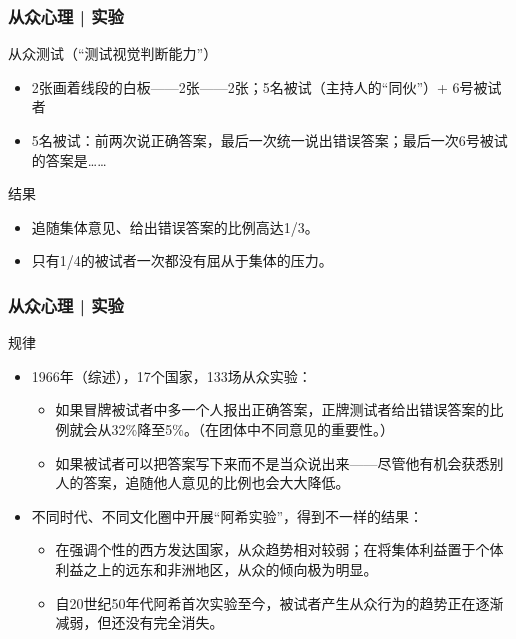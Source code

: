 \begin{frame}
  \frametitle{从众心理 | 实验}
  \begin{block}{从众测试（“测试视觉判断能力”）}
    \begin{itemize}
      \item 2张画着线段的白板——2张——2张；5名被试（主持人的“同伙”）+ 6号被试者
      \item 5名被试：前两次说正确答案，最后一次统一说出错误答案；最后一次6号被试的答案是……
    \end{itemize}
  \end{block}
  \pause
  \begin{block}{结果}
    \begin{itemize}
      \item 追随集体意见、给出错误答案的比例高达1/3。
      \item 只有1/4的被试者一次都没有屈从于集体的压力。
    \end{itemize}
  \end{block}
\end{frame}

\begin{frame}
  \frametitle{从众心理 | 实验}
  \begin{block}{规律}
    \begin{itemize}
      \item 1966年（综述），17个国家，133场从众实验：
    \begin{itemize}
      \item 如果冒牌被试者中多一个人报出正确答案，正牌测试者给出错误答案的比例就会从32\%降至5\%。（\alert{在团体中不同意见的重要性。}）
      \item 如果被试者可以把答案写下来而不是当众说出来——尽管他有机会获悉别人的答案，追随他人意见的比例也会大大降低。
    \end{itemize}
      \item 不同时代、不同文化圈中开展“阿希实验”，得到不一样的结果：
        \begin{itemize}
      \item 在强调个性的西方发达国家，从众趋势相对较弱；在将集体利益置于个体利益之上的远东和非洲地区，从众的倾向极为明显。
      \item 自20世纪50年代阿希首次实验至今，被试者产生从众行为的趋势正在逐渐减弱，但还没有完全消失。
        \end{itemize}
    \end{itemize}
  \end{block}
\end{frame}

